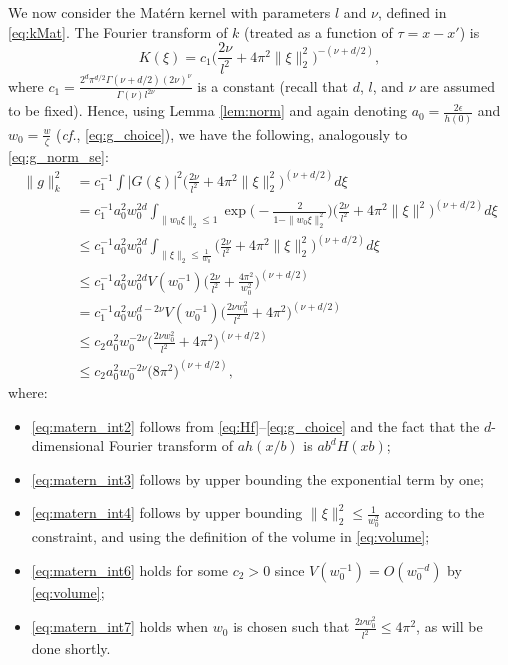 \documentclass[english,onecolumn,final,11pt]{IEEEtran} %
\begin{document}
We now consider the Mat\'ern  kernel with parameters $l$ and $\nu$, defined in \eqref{eq:kMat}.  The Fourier transform of $k$ (treated as a function of $\tau = x-x'$) is \cite[Sec.~4.2]{Ras06}
\begin{equation}
    K(\xi) = c_1 \bigg( \frac{2\nu}{l^2} + 4\pi^2 \|\xi\|_2^2 \bigg)^{-(\nu + d/2)},
\end{equation}
where $c_1 = \frac{ 2^d \pi^{d/2} \Gamma(\nu + d/2) (2\nu)^{\nu} }{ \Gamma(\nu) l^{2\nu} }$ is a constant (recall that $d$, $l$, and $\nu$ are assumed to be fixed).  Hence, using Lemma \ref{lem:norm} and  again denoting $a_0 = \frac{2\epsilon}{h(0)}$ and $w_0 = \frac{w}{\zeta}$ (\emph{cf.}, \eqref{eq:g_choice}), we have the following, analogously to \eqref{eq:g_norm_se}:
{ \allowdisplaybreaks
\begin{align} 
    \|g\|_k^2
        &= c_1^{-1} \int |G(\xi)|^2 \bigg( \frac{2\nu}{l^2} + 4\pi^2 \|\xi\|_2^2 \bigg)^{(\nu + d/2)} d\xi \label{eq:matern_int1} \\
        &= c_1^{-1} a_0^2 w_0^{2d} \int_{\|w_0 \xi\|_2 \le 1} \exp\bigg( - \frac{2}{ 1-\| w_0 \xi\|_2^2 } \bigg)\bigg( \frac{2\nu}{l^2} + 4\pi^2 \|\xi\|^2 \bigg)^{(\nu + d/2)} d\xi \label{eq:matern_int2} \\
        &\le c_1^{-1} a_0^2 w_0^{2d} \int_{\|\xi\|_2 \le \frac{1}{w_0}}\bigg( \frac{2\nu}{l^2} + 4\pi^2 \|\xi\|_2^2 \bigg)^{(\nu + d/2)} d\xi \label{eq:matern_int3} \\
        &\le c_1^{-1} a_0^2 w_0^{2d} V(w_0^{-1}) \bigg( \frac{2\nu}{l^2} + \frac{4\pi^2}{w_0^2} \bigg)^{(\nu + d/2)}  \label{eq:matern_int4} \\
        &= c_1^{-1} a_0^2 w_0^{d-2\nu} V(w_0^{-1}) \bigg( \frac{2\nu w_0^2}{l^2} + 4\pi^2 \bigg)^{(\nu + d/2)} \label{eq:matern_int5}  \\
        &\le c_2 a_0^2 w_0^{-2\nu} \bigg( \frac{2\nu w_0^2}{l^2} + 4\pi^2 \bigg)^{(\nu + d/2)} \label{eq:matern_int6} \\
        &\le c_2 a_0^2 w_0^{-2\nu} \big(8\pi^2\big)^{(\nu + d/2)}, \label{eq:matern_int7} 
\end{align} }
where:
\begin{itemize}
    \item \eqref{eq:matern_int2} follows from \eqref{eq:Hf}--\eqref{eq:g_choice} and the fact that the $d$-dimensional Fourier transform of $a h(x/b)$ is $ab^d H(xb)$;
    \item \eqref{eq:matern_int3} follows by upper bounding the exponential term by one;
    \item \eqref{eq:matern_int4} follows by upper bounding $\|\xi\|_2^2 \le \frac{1}{w_0^2}$ according to the constraint, and using the definition of the volume in \eqref{eq:volume};
    \item \eqref{eq:matern_int6} holds for some $c_2 > 0$ since $V(w_0^{-1}) = O(w_0^{-d})$ by \eqref{eq:volume};
    \item \eqref{eq:matern_int7} holds when $w_0$ is chosen such that $\frac{2\nu w_0^2}{l^2} \le 4\pi^2$, as will be done shortly.
\end{itemize}
\end{document}
